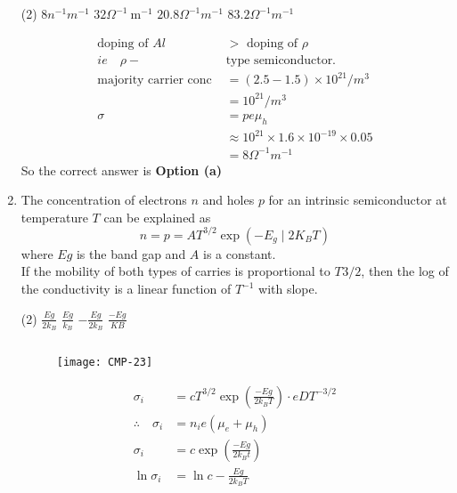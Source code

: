 \begin{enumerate}
	\begin{tasks}(2)
		\task[\textbf{a.}]$8 n^{-1} m^{-1}$
		\task[\textbf{b.}]$32 \Omega^{-1} \mathrm{~m}^{-1}$
		\task[\textbf{c.}]$20.8\Omega^{-1}m^{-1}$
		\task[\textbf{d.}]  $83.2 \Omega^{-1}m^{-1}$
	\end{tasks}
\begin{answer}
	\begin{align*}
	\text{doping of }Al&>\text{ doping of }\rho\\
	ie \quad\rho-&\text{type semiconductor.}\\
	\text{majority carrier conc }&=(2.5-1.5)\times10^{21}/m^3\\
	&=10^{21}/m^3\\
	\sigma &=p e \mu_{h} \\
	& \approx 10^{21} \times 1.6 \times 10^{-19} \times 0.05\\
	&=8\Omega^{-1}m^{-1}
	\end{align*}
	So the correct answer is \textbf{Option (a)}
\end{answer}
\item 
	The concentration of electrons $n$ and holes $p$ for an intrinsic semiconductor at temperature $T$ can be explained as 
	$$n=p=A T^{3 / 2} \exp \left(-E_{g} \mid 2 K_{B} T\right)$$
	where $Eg$ is the band gap and $A$ is a constant.\\
	If the mobility of both types of carries is proportional to $T^{}3/2$, then the log of the conductivity is a linear function of $T^{-1}$ with slope.
	\begin{tasks}(2)
		\task[\textbf{a.}]$\frac{E g}{2 k_{B}}$
		\task[\textbf{b.}]$\frac{E g}{k_{B}}$
		\task[\textbf{c.}]$-\frac{E g}{2 k_{B}}$
		\task[\textbf{d.}] $\frac{-E g}{K B}$
	\end{tasks}
\begin{answer}$\left. \right. $
	\begin{figure}[H]
		\centering
		\texttt{[image: CMP-23]}
		\caption{}
		\label{}
	\end{figure}
	\begin{align*}
	\sigma_{i}&=c T^{3 / 2} \exp \left(\frac{-E g}{2 k_{B} T}\right) \cdot e D T^{-3 / 2}\\
	\therefore \quad \sigma_{i}&=n_{i} e\left(\mu_{e}+\mu_{h}\right)\hspace{1cm}\\
	\sigma_{i}&=c \exp \left(\frac{-E g}{2 k_{B} t}\right)\\
	\ln \sigma_{i}&=\ln c-\frac{E g}{2 k_{B} T}\\

\end{align*}
\end{answer}
\end{enumerate}
